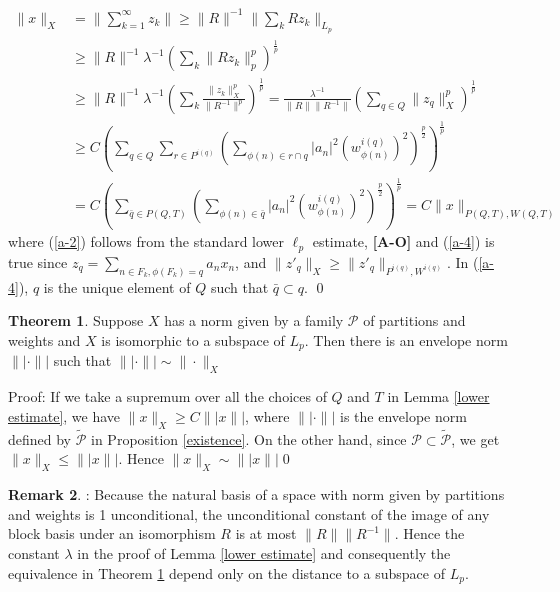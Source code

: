 \documentclass[12pt]{amsart}
\theoremstyle{definition}
\newtheorem{theorem}{Theorem}[section]
\newtheorem{remark}[theorem]{Remark}
\theoremstyle{remark}
\numberwithin{equation}{section}
\begin{document}
\begin{align}
\|x\|_X&=\|\sum_{k=1}^{\infty} z_k\|
\ge \|R\|^{-1}\|\sum_k Rz_k\|_{L_p}\nonumber\\
&\ge \|R\|^{-1}\lambda^{-1}\left(\sum_k\|Rz_k\|_{p}^{p}\right)^
{\frac{1}{p}}\label{a-2}\\ 
&\ge \|R\|^{-1}\lambda^{-1}\left(\sum_k \frac {\|z_k\|_{X}^{p}}
{\|R^{-1}\|^p}\right)^{\frac{1}{p}}
=\frac{\lambda^{-1}}{\|R\|\|R^{-1}\|}\left(\sum_{q\in Q}
\|z_q\|_{X}^{p}\right)^{\frac{1}{p}}\nonumber\\
&\ge C\left(\sum_{q\in Q}\sum_{r\in P^{i(q)}} 
\left(\sum_{\phi(n) \in {r\cap q}}
 |a_{n}|^2(w_{\phi(n)}^{i(q)})^2\right)^{\frac{p}{2}}\right)^
{\frac{1}{p}}\label{a-4}\\
&=C\left(\sum_{\bar{q}\in P(Q,T)}\left(\sum_{\phi(n)\in \bar{q}} 
 |a_{n}|^2(w_{\phi(n)}^{i(q)})^2\right)^{\frac{p}{2}}\right)^
{\frac{1}{p}}
=C\|x\|_{P(Q,T), W(Q,T)}\nonumber
\end{align}
where
(\ref{a-2}) follows from the standard lower $\ell_p$ estimate,
 {\bf{[A-O]}} and  (\ref{a-4}) is true since 
$ z_q=\sum_{n\in F_k, \phi(F_k)=q} a_n x_n$, and 
$\|z'_q\|_X \ge \|z'_q\|_{P^{i(q)},W^{i(q)}}$. 
 In (\ref{a-4}), $q$ is the unique element of $Q$ such that
 $\bar{q}\subset q$.
\qed

\begin{theorem}\label{equivalent norm}
Suppose $X$ has a norm given by a family $\mathcal{P}$ of partitions and
 weights and $X$ is isomorphic to a subspace of $L_p$. Then
 there is an envelope norm $\||\cdot\||$ such that
 $\||\cdot \|| \sim \|\cdot\|_X$
\end{theorem}

Proof: If we take a supremum over all the choices of $Q$
 and $T$ in Lemma \ref{lower estimate}, we have $\|x\|_X \ge C \||
 x\||$, where $\||\cdot\||$ is the envelope norm defined by 
$\tilde{\mathcal{P}}$ in Proposition \ref{existence}. 
On the other hand, 
since ${\mathcal{P}}\subset \tilde{\mathcal{P}}$,
 we get $\|x\|_X \le \|| x\||$. Hence  $\|x\|_X \sim \|| x\||$\qed

\begin{remark}: Because the natural basis of a space with norm given 
by partitions and weights is 1 unconditional, the unconditional
constant of the image of any block basis under an isomorphism $R$ is
at most $\|R\|\|R^{-1}\|$. Hence the constant $\lambda$ in the proof of Lemma 
\ref{lower estimate} and consequently the equivalence in Theorem 
\ref{equivalent norm} depend only on the distance to a subspace of $L_p$.
\end{remark}
\end{document}
